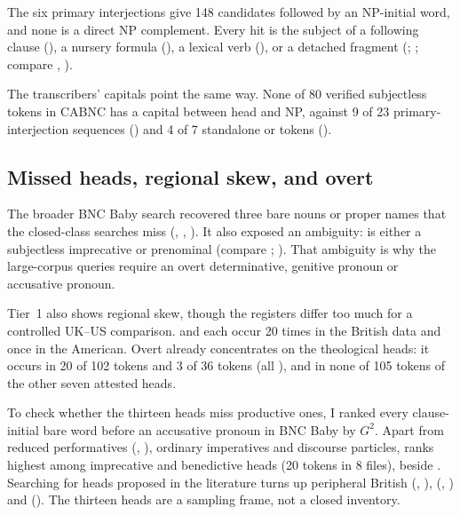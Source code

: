 \documentclass[12pt]{article}
\begin{document}
The six primary interjections give 148 candidates followed by an NP-initial word, and none is a direct NP complement. Every hit is the subject of a following clause (), a nursery formula (), a lexical verb (), or a detached fragment (; ; compare , ).

The transcribers' capitals point the same way. None of 80 verified subjectless tokens in CABNC has a capital between head and NP, against 9 of 23 primary-interjection sequences () and 4 of 7 standalone  or  tokens ().

\subsection{Missed heads, regional skew, and overt }
\label{sec:tier1-regional}

The broader BNC Baby search recovered three bare nouns or proper names that the closed-class searches miss (, , ). It also exposed an ambiguity:  is either a subjectless imprecative or prenominal  (compare ; \citealp[35 n.\ 29]{portner2026}). That ambiguity is why the large-corpus queries require an overt determinative, genitive pronoun or accusative pronoun.

Tier~1 also shows regional skew, though the registers differ too much for a controlled UK--US comparison.  and  each occur 20 times in the British data and once in the American. Overt  already concentrates on the theological heads: it occurs in 20 of 102  tokens and 3 of 36  tokens (all ), and in none of 105 tokens of the other seven attested heads.

To check whether the thirteen heads miss productive ones, I ranked every clause-initial bare word before an accusative pronoun in BNC Baby by $G^2$. Apart from reduced performatives (, ), ordinary imperatives and discourse particles,  ranks highest among imprecative and benedictive heads (20 tokens in 8 files), beside . Searching for heads proposed in the literature turns up peripheral British  (, ),  (, ) and  (). The thirteen heads are a sampling frame, not a closed inventory.
\end{document}
